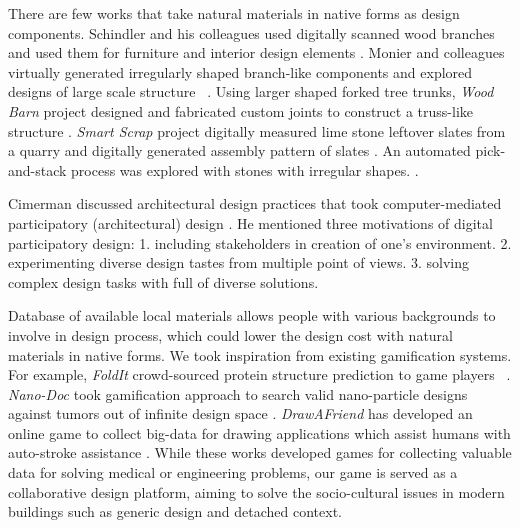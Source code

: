 There are few works that take natural materials in native forms as design components.
Schindler and his colleagues used digitally scanned wood branches and used them for furniture and interior design elements \cite{schindler2014processing}.
Monier and colleagues virtually generated irregularly shaped branch-like components and explored designs of large scale structure ~\cite{monier2013use}.
Using larger shaped forked tree trunks, \textit{Wood Barn} project designed and fabricated custom joints to construct a truss-like structure \cite{woodbarn}.
\textit{Smart Scrap} project digitally measured lime stone leftover slates from a quarry and digitally generated assembly pattern of slates \cite{smartscrap}.
An automated pick-and-stack process was explored with stones with irregular shapes. \cite{stonestacking}.

Cimerman discussed architectural design practices that took computer-mediated participatory (architectural) design \cite{cimerman2000participatory}.
He mentioned three motivations of digital participatory design:
1. including stakeholders in creation of one's environment.
2. experimenting diverse design tastes from multiple point of views.
3. solving complex design tasks with full of diverse solutions.

Database of available local materials allows people with various backgrounds to involve in design process, which could lower the design cost with natural materials in native forms.
We took inspiration from existing gamification systems.
For example, \textit{FoldIt} crowd-sourced protein structure prediction to game players ~\cite{cooper2010predicting}.
\textit{Nano-Doc} took gamification approach to search valid nano-particle designs against tumors out of infinite design space \cite{hauert2013computational}.
\textit{DrawAFriend} has developed an online game to collect big-data for drawing applications which assist humans with auto-stroke assistance \cite{limpaecher2013real}.
While these works developed games for collecting valuable data for solving medical or engineering problems, our game is served as a collaborative design platform, aiming to solve the socio-cultural issues in modern buildings such as generic design and detached context.
